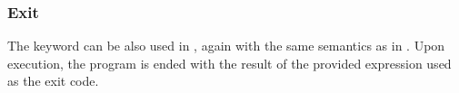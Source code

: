 \subsubsection{Exit}

The  keyword can be also used in \Poetry{}, again with the same
semantics as in \Prose{}. Upon execution, the program is ended with the
result of the provided expression used as the exit code.

\begin{bnf*}
\end{bnf*}

\begin{prooftree}
\end{prooftree}
